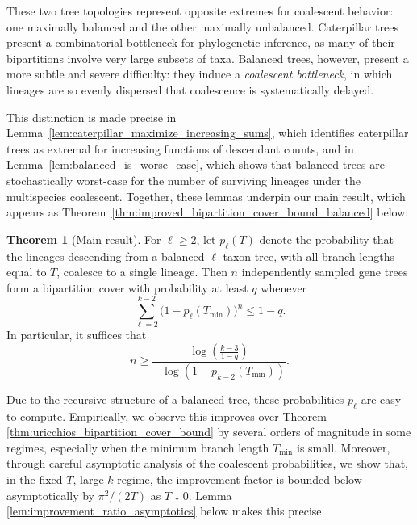\documentclass[10pt,oneside,reqno]{article}
\theoremstyle{plain}
\theoremstyle{definition}
\numberwithin{equation}{section}
\renewcommand{\leq}{\leqslant}
\renewcommand{\geq}{\geqslant}
\newtheorem*{theorem*}{Theorem}
\begin{document}


These two tree topologies represent opposite extremes for coalescent behavior: one maximally balanced and the other maximally unbalanced. Caterpillar trees present a combinatorial bottleneck for phylogenetic inference, as many of their bipartitions involve very large subsets of taxa. Balanced trees, however, present a more subtle and severe difficulty: they induce a \emph{coalescent bottleneck}, in which lineages are so evenly dispersed that coalescence is systematically delayed.

This distinction is made precise in Lemma~\ref{lem:caterpillar_maximize_increasing_sums}, which identifies caterpillar trees as extremal for increasing functions of descendant counts, and in Lemma~\ref{lem:balanced_is_worse_case}, which shows that balanced trees are stochastically worst-case for the number of surviving lineages under the multispecies coalescent. Together, these lemmas underpin our main result, which appears as Theorem~\ref{thm:improved_bipartition_cover_bound_balanced} below:

\begin{theorem*}[Main result]
For $\ell\geq 2$, let $p_\ell(T)$ denote the probability that the lineages descending 
from a balanced $\ell$-taxon tree, with all branch lengths equal to $T$, coalesce to a single 
lineage. Then $n$ independently sampled gene trees form a bipartition cover with probability at least $q$ whenever
\[
    \sum_{\ell=2}^{k-2}\bigl(1-p_\ell(T_{\min})\bigr)^n\leq 1-q.
\]
In particular, it suffices that
\[
    n\geq
    \frac{\log\!\left(\frac{k-3}{1-q}\right)}
         {-\log\!\left(1-p_{k-2}(T_{\min})\right)}.
\]
\end{theorem*}

\noindent Due to the recursive structure of a balanced tree, these probabilities $p_\ell$ are easy 
to compute. Empirically, we observe this improves over Theorem \ref{thm:uricchios_bipartition_cover_bound} by
several orders of magnitude in some regimes, especially when the minimum branch length $T_{\mathrm{min}}$ is small. Moreover, through careful asymptotic analysis of the coalescent 
probabilities, we show that, in the fixed-$T$, large-$k$ regime, the improvement factor is 
bounded below asymptotically by $\pi^2/(2T)$ as $T \downarrow 0$.
 Lemma \ref{lem:improvement_ratio_asymptotics} below makes this precise. 

\end{document}
